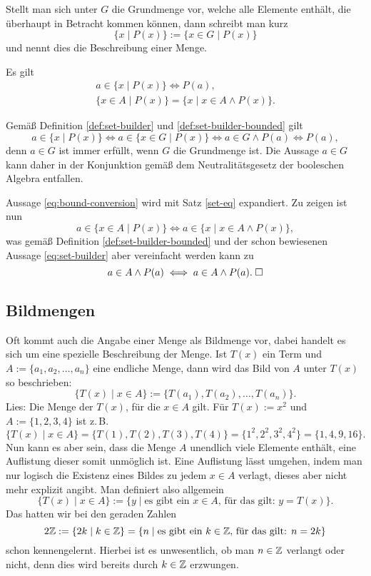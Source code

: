 \begin{Definition}%
\label{def:set-builder}
Stellt man sich unter $G$ die Grundmenge vor, welche
alle Elemente enthält, die überhaupt in Betracht kommen können,
dann schreibt man kurz%
\[\{x\mid P(x)\} := \{x\in G\mid P(x)\}\]
und nennt dies die Beschreibung einer Menge.
\end{Definition}
\begin{Satz}
Es gilt
\begin{gather}
\label{eq:set-builder}
a\in\{x\mid P(x)\}\iff P(a),\\
\label{eq:bound-conversion}
\{x\in A\mid P(x)\} = \{x\mid x\in A\land P(x)\}.
\end{gather}
\end{Satz}
 Gemäß Definition \ref{def:set-builder}
und \ref{def:set-builder-bounded} gilt%
\[a\in\{x\mid P(x)\} \iff a\in\{x\in G\mid P(x)\}
\iff a\in G\land P(a)\iff P(a),\]
denn $a\in G$ ist immer erfüllt, wenn $G$ die Grundmenge ist.
Die Aussage $a\in G$ kann daher in der Konjunktion gemäß dem
Neutralitätsgesetz der booleschen Algebra entfallen.

Aussage \eqref{eq:bound-conversion} wird mit Satz \ref{set-eq}
expandiert. Zu zeigen ist nun
\[a\in\{x\in A\mid P(x)\}\iff a\in\{x\mid x\in A\land P(x)\},\]
was gemäß Definition \ref{def:set-builder-bounded} und der schon
bewiesenen Aussage \eqref{eq:set-builder} aber vereinfacht
werden kann zu
\[a\in A\land P(a)\iff a\in A\land P(a).\;\Box\]


\subsection{Bildmengen}

Oft kommt auch die Angabe einer Menge als Bildmenge vor, dabei
handelt es sich um eine spezielle Beschreibung der Menge. Ist
$T(x)$ ein Term und $A:=\{a_1,a_2,\ldots,a_n\}$ eine endliche
Menge, dann wird das Bild von $A$ unter $T(x)$ so beschrieben:
\[\{T(x)\mid x\in A\} := \{T(a_1),T(a_2),\ldots, T(a_n)\}.\]
Lies: Die Menge der $T(x)$, für die $x\in A$ gilt.
Für $T(x):=x^2$ und $A:=\{1,2,3,4\}$ ist z.\,B.
\[\{T(x)\mid x\in A\} = \{T(1), T(2), T(3), T(4)\}
= \{1^2,2^2,3^2,4^2\} = \{1,4,9,16\}.\]
Nun kann es aber sein, dass die Menge $A$ unendlich viele Elemente
enthält, eine Auflistung dieser somit unmöglich ist. Eine Auflistung
lässt umgehen, indem man nur logisch die Existenz eines Bildes
zu jedem $x\in A$ verlagt, dieses aber nicht mehr explizit angibt.
Man definiert also allgemein
\[\{T(x)\mid x\in A\} := \{y\mid\text{es gibt ein $x\in A$, für das gilt: $y=T(x)$}\}.\]
Das hatten wir bei den geraden Zahlen
\[2\mathbb Z := \{2k\mid k\in\mathbb Z\} = \{n\mid\text{es gibt ein $k\in\mathbb Z$, für das gilt: $n=2k$}\}\]
schon kennengelernt. Hierbei ist es unwesentlich, ob man $n\in\mathbb Z$ verlangt
oder nicht, denn dies wird bereits durch $k\in\mathbb Z$ erzwungen.


